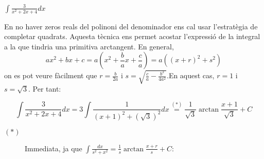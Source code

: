 \Exercise[title={$\int \frac{dx}{ax^2 + bx + c}$, amb denominador sense arrels reals (arctangent)}]
  \vspace{5mm}
  $\int \frac{3}{x^2+2x+4} dx$
  


\Answer


    En no haver zeros reals del polinoni del denominador ens cal usar l'estratègia de completar quadrats. Aquesta tècnica ens permet acostar l'expressió de la integral a la que tindria una primitiva arctangent.
    En general,
    \[
      ax^2+bx+c=a\left(x^2+\frac{b}{a}x+\frac{c}{a}\right)=a\left((x+r)^2+s^2\right)
    \]
    on es pot veure fàcilment que $r=\frac{b}{2a}$ i $s=\sqrt{\frac{c}{a}-\frac{b^2}{4a^2}}$.En aquest cas, $r=1$ i $s=\sqrt{3}$. Per tant:

    \[
      \int \frac{3}{x^2+2x+4} dx=3\int \frac{1}{(x+1)^2+(\sqrt{3})^2} dx\stackrel{(*)}{=} \frac{1}{\sqrt{3}}\arctan{\frac{x+1}{\sqrt{3}}}+C
    \]
    \begin{description}
      \item[$(*)$] Immediata, ja que $\int \frac{dx}{s^2+x^2}=\frac{1}{s}\arctan{\frac{x+r}{s}}+C$:
    \end{description}

\blacksquare


